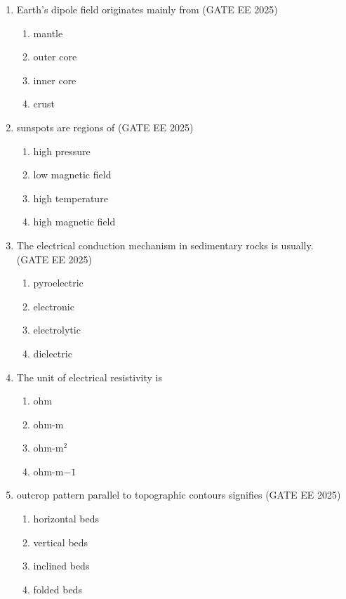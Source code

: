 \documentclass[journal]{IEEEtran}
\begin{document}
\begin{enumerate}[start=1]
\item Earth's dipole field originates mainly from
\hfill{(GATE EE 2025)}
\begin{enumerate}
\item mantle
\item outer core
\item inner core
\item crust
\end{enumerate}

\item  sunspots are regions of
\hfill{(GATE EE 2025)}
\begin{enumerate}
\item high pressure
\item low magnetic field
\item high temperature
\item high magnetic field
\end{enumerate}

\item  The electrical conduction mechanism in  sedimentary rocks is usually.\\
\hfill{(GATE EE 2025)}

\begin{enumerate}
\item pyroelectric
\item electronic
\item electrolytic
\item dielectric
\end{enumerate}


\item  The unit of electrical resistivity is
\hfill{}
\begin{enumerate}
\item ohm
\item ohm-m
\item ohm-m$^2$
\item ohm-m$-1$
\end{enumerate}


\item  outcrop pattern parallel to topographic contours signifies
\hfill{(GATE EE 2025)}
\begin{enumerate}
    \item horizontal beds
    \item vertical beds
    \item inclined beds
    \item folded beds
\end{enumerate}


\end{enumerate}
\end{document}
